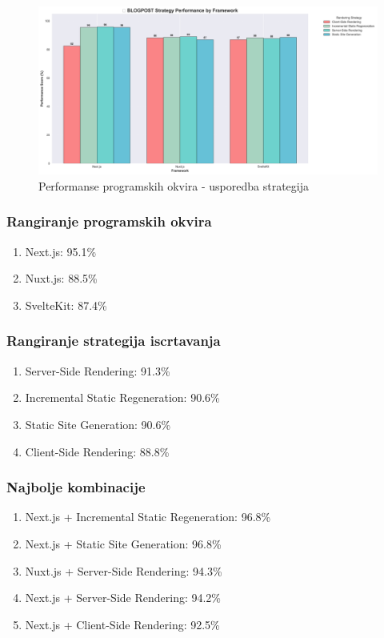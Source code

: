 \begin{figure}[H]
    \centering
    \includegraphics[width=\textwidth]{slike/rezultati/blog-post/blogPost_strategy_comparison.png}
    \caption{Performanse programskih okvira - usporedba strategija}
    \label{fig:testiranje-blog-post-usporedba-strategija}
\end{figure}

\subsubsection{Rangiranje programskih okvira}
\begin{enumerate}
    \item Next.js: 95.1\%
    \item Nuxt.js: 88.5\%
    \item SvelteKit: 87.4\%
\end{enumerate}

\subsubsection{Rangiranje strategija iscrtavanja}
\begin{enumerate}
    \item Server-Side Rendering: 91.3\%
    \item Incremental Static Regeneration: 90.6\%
    \item Static Site Generation: 90.6\%
    \item Client-Side Rendering: 88.8\%
\end{enumerate}

\subsubsection{Najbolje kombinacije}
\begin{enumerate}
    \item Next.js + Incremental Static Regeneration: 96.8\%
    \item Next.js + Static Site Generation: 96.8\%
    \item Nuxt.js + Server-Side Rendering: 94.3\%
    \item Next.js + Server-Side Rendering: 94.2\%
    \item Next.js + Client-Side Rendering: 92.5\%
\end{enumerate}

